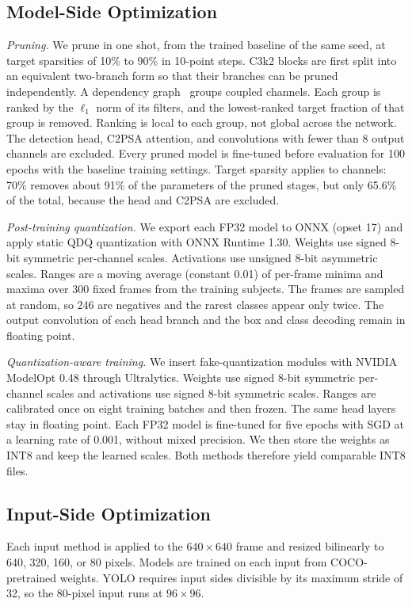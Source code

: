 \documentclass[conference]{IEEEtran}
\begin{document}
\subsection{Model-Side Optimization}
\label{sec:pruning}
\emph{Pruning.} We prune in one shot, from the trained baseline of the same seed, at target sparsities of 10\% to 90\% in 10-point steps. C3k2 blocks are first split into an equivalent two-branch form so that their branches can be pruned independently. A dependency graph~\cite{b12} groups coupled channels. Each group is ranked by the $\ell_1$ norm of its filters, and the lowest-ranked target fraction of that group is removed. Ranking is local to each group, not global across the network. The detection head, C2PSA attention, and convolutions with fewer than 8 output channels are excluded. Every pruned model is fine-tuned before evaluation for 100 epochs with the baseline training settings. Target sparsity applies to channels: 70\% removes about 91\% of the parameters of the pruned stages, but only 65.6\% of the total, because the head and C2PSA are excluded.

\emph{Post-training quantization.} We export each FP32 model to ONNX (opset 17) and apply static QDQ quantization with ONNX Runtime 1.30. Weights use signed 8-bit symmetric per-channel scales. Activations use unsigned 8-bit asymmetric scales. Ranges are a moving average (constant 0.01) of per-frame minima and maxima over 300 fixed frames from the training subjects. The frames are sampled at random, so 246 are negatives and the rarest classes appear only twice. The output convolution of each head branch and the box and class decoding remain in floating point.

\emph{Quantization-aware training.} We insert fake-quantization modules with NVIDIA ModelOpt 0.48 through Ultralytics. Weights use signed 8-bit symmetric per-channel scales and activations use signed 8-bit symmetric scales. Ranges are calibrated once on eight training batches and then frozen. The same head layers stay in floating point. Each FP32 model is fine-tuned for five epochs with SGD at a learning rate of 0.001, without mixed precision. We then store the weights as INT8 and keep the learned scales. Both methods therefore yield comparable INT8 files.

\subsection{Input-Side Optimization}
\label{sec:input}
Each input method is applied to the $640\times640$ frame and resized bilinearly to 640, 320, 160, or 80 pixels. Models are trained on each input from COCO-pretrained weights. YOLO requires input sides divisible by its maximum stride of 32, so the 80-pixel input runs at $96\times96$.
\end{document}
